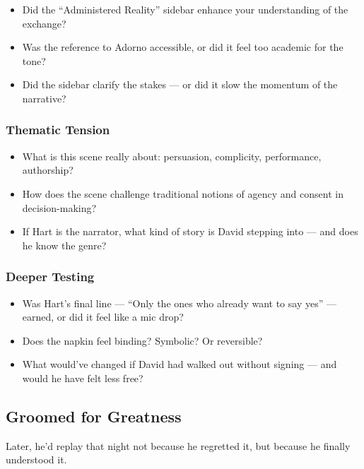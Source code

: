     \begin{itemize}
      \item Did the ``Administered Reality'' sidebar enhance your understanding of the exchange?
      \item Was the reference to Adorno accessible, or did it feel too academic for the tone?
      \item Did the sidebar clarify the stakes — or did it slow the momentum of the narrative?
    \end{itemize}
    
    \subsubsection*{Thematic Tension}
    
    \begin{itemize}
      \item What is this scene really about: persuasion, complicity, performance, authorship?
      \item How does the scene challenge traditional notions of agency and consent in decision-making?
      \item If Hart is the narrator, what kind of story is David stepping into — and does he know the genre?
    \end{itemize}
    
    \subsubsection*{Deeper Testing}
    
    \begin{itemize}
      \item Was Hart’s final line — “Only the ones who already want to say yes” — earned, or did it feel like a mic drop?
      \item Does the napkin feel binding? Symbolic? Or reversible?
      \item What would’ve changed if David had walked out without signing — and would he have felt less free?
    \end{itemize}
    




\subsection{Groomed for Greatness}

Later, he’d replay that night not because he regretted it, but because he finally understood it.

